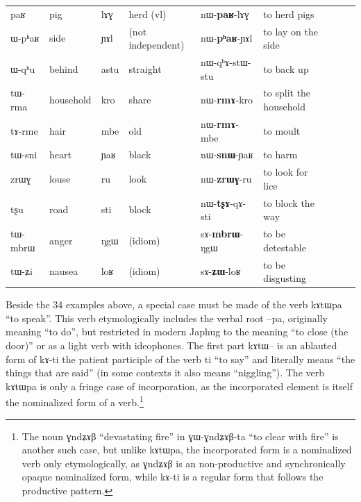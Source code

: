 \documentclass[oldfontcommands,oneside,a4paper,11pt]{article}
\newcommand{\ipa}[1]{{\phon #1}} %
\begin{document}
\begin{landscape}
\begin{table} [h]
\begin{tabular}{lllllllll}
        \ipa{paʁ} & pig & \ipa{lɤɣ} & herd (vl) & \ipa{nɯ-\textbf{paʁ}-lɤɣ} & to herd pigs    \\ 
    \ipa{ɯ-pʰaʁ} & side & \ipa{ɲɤl} & (not independent) & \ipa{nɯ-\textbf{pʰaʁ}-ɲɤl} & to lay on the side    \\ 
       \ipa{ɯ-qʰu} & behind & \ipa{astu} & straight & \ipa{nɯ-qʰɤ-stɯ-stu} & to back up    \\       
           \ipa{tɯ-rma} & household & \ipa{kro} & share & \ipa{nɯ-\textbf{rmɤ}-kro} & to split the household   \\ 
                  \ipa{tɤ-rme} & hair & \ipa{mbe} & old & \ipa{nɯ-\textbf{rmɤ}-mbe} & to moult  \\                    
        \ipa{tɯ-sni} & heart & \ipa{ɲaʁ} &black & \ipa{nɯ-\textbf{snɯ}-ɲaʁ} &   to harm \\                   
   \ipa{zrɯɣ} & louse & \ipa{ru} &look & \ipa{nɯ-\textbf{zrɯɣ}-ru} &   to look for lice \\                           
     \ipa{tʂu} & road & \ipa{sti} &block & \ipa{nɯ-\textbf{tʂɤ}-qɤ-sti} &  to block the way  \\                           
  \ipa{tɯ-mbrɯ} & anger & \ipa{ŋgɯ} &(idiom) & \ipa{sɤ-\textbf{mbrɯ}-ŋgɯ} &  to be detestable \\                           
        \ipa{tɯ-ʑi} & nausea & \ipa{loʁ} & (idiom) & \ipa{sɤ-\textbf{ʑɯ}-loʁ} & to be disgusting \\
\bottomrule
 \end{tabular} 
\end{table} 
  \end{landscape}
Beside the 34 examples above, a special case must be made of the verb \ipa{kɤtɯpa} ``to speak''. This verb   etymologically includes the verbal root \ipa{--pa}, originally meaning ``to do'', but restricted in modern Japhug to the meaning ``to close (the door)'' or as a light verb with ideophones. The first part \ipa{kɤtɯ}-- is an ablauted form of \ipa{kɤ-ti} the patient participle of the verb \ipa{ti} ``to say'' and literally means ``the things that are said'' (in some contexts it also means ``niggling''). The verb \ipa{kɤtɯpa} is only a fringe case of incorporation, as the incorporated element is itself the nominalized form of a verb.\footnote{The noun  \ipa{ɣndʑɤβ} ``devastating fire'' in \ipa{ɣɯ-ɣndʑɤβ-ta} ``to clear with fire'' is another such case, but unlike \ipa{kɤtɯpa}, the incorporated form is a nominalized verb only etymologically, as  \ipa{ɣndʑɤβ} is an non-productive and synchronically opaque nominalized form, while  \ipa{kɤ-ti} is a regular form that follows the productive pattern. } 
\end{document}

